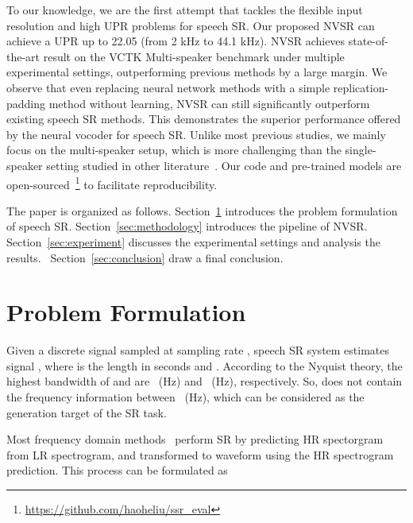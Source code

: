 \documentclass[a4paper]{article}
\def\Secref#1{Section~\ref{#1}}
\begin{document}
To our knowledge, we are the first attempt that tackles the flexible input resolution and high UPR problems for speech SR. Our proposed NVSR can achieve a UPR up to \num{22.05} (from \num{2} kHz to \num{44.1} kHz).
NVSR achieves state-of-the-art result on the VCTK Multi-speaker benchmark under multiple experimental settings, outperforming previous methods by a large margin. We observe that even replacing neural network methods with a simple replication-padding method without learning, NVSR can still significantly outperform existing speech SR methods. This demonstrates the superior performance offered by the neural vocoder for speech SR. Unlike most previous studies, we mainly focus on the multi-speaker setup, which is more challenging than the single-speaker setting studied in other literature~\cite{heming-towards-sr-wang2021towards}. Our code and pre-trained models are open-sourced~\footnote{ \url{https://github.com/haoheliu/ssr\_eval}} to facilitate reproducibility.


























The paper is organized as follows. \Secref{sec:problem-formulation} introduces the problem formulation of speech SR. \Secref{sec:methodology} introduces the pipeline of NVSR.
\Secref{sec:experiment} discusses the experimental settings and analysis the results. ~\Secref{sec:conclusion} draw a final conclusion.


\section{Problem Formulation}
\label{sec:problem-formulation}
Given a discrete signal  sampled at sampling rate , speech SR system estimates signal , where  is the length in seconds and . According to the Nyquist theory, the highest bandwidth of  and  are ~(Hz) and ~(Hz), respectively. So,  does not contain the frequency information between ~(Hz), which can be considered as the generation target of the SR task. 

Most frequency domain methods~\cite{audio-supre-resolution-SR-kuleshov2017audio, tf-network-sr-lim2018time} perform SR by predicting HR spectorgram from LR spectrogram, and transformed to waveform using the HR spectrogram prediction. This process can be formulated as 
\end{document}
